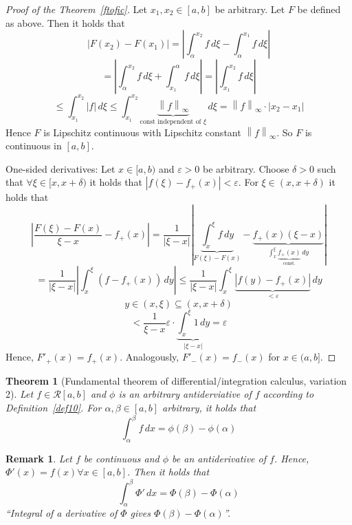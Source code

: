\documentclass{article}
\newtheorem{theorem}{Theorem}  \numberwithin{theorem}{section}
\newtheorem{remark}{Remark}  \numberwithin{remark}{section}
\newcommand{\norm}[1]{\left\|#1\right\|}
\newcommand{\card}[1]{\left|#1\right|}
\begin{document}
\begin{proof}[Proof of the Theorem~\ref{ftofic}]
  Let $x_1, x_2 \in [a,b]$ be arbitrary. Let $F$ be defined as above. Then it holds that
  \[ \card{F(x_2) - F(x_1)} = \card{\int_\alpha^{x_2} f \, d\xi - \int_\alpha^{x_1} f \, d\xi} \]
  \[ = \card{\int_\alpha^{x_2} f \, d\xi + \int_{x_1}^\alpha f \, d\xi} = \card{\int_{x_1}^{x_2} f \, d\xi} \]
  \[ \leq \int_{x_1}^{x_2} \card{f} \, d\xi \leq \int_{x_1}^{x_2} \underbrace{\norm{f}_{\infty}}_{\text{const independent of } \xi} \, d\xi  = \norm{f}_{\infty} \cdot \card{x_2 - x_1} \]
  Hence $F$ is Lipschitz continuous with Lipschitz constant $\norm{f}_{\infty}$. So $F$ is continuous in $[a,b]$.

  One-sided derivatives: Let $x \in [a,b)$ and $\varepsilon > 0$ be arbitrary.
  Choose $\delta > 0$ such that $\forall \xi \in [x, x+\delta)$ it holds that $\card{f(\xi) - f_+(x)} < \varepsilon$.
  For $\xi \in (x, x+\delta)$ it holds that
  \[ \card{\frac{F(\xi) - F(x)}{\xi - x} - f_+(x)} = \frac1{\card{\xi - x}} \card{\underbrace{\int_x^\xi f \, dy}_{F(\xi) - F(x)} - \underbrace{f_+(x)(\xi - x)}_{\int_x^\xi \underbrace{f_+(x)}_{\text{const.}} \, dy}} \]
  \[ = \frac{1}{\card{\xi - x}} \card{\int_x^\xi (f - f_+(x)) \, dy} \leq \frac{1}{\card{\xi - x}} \int_x^\xi \underbrace{\card{f(y) - f_+(x)}}_{< \varepsilon} \, dy \]
  \[ y \in (x, \xi) \subseteq (x, x+\delta) \]
  \[ < \frac{1}{\xi - x} \varepsilon \cdot \underbrace{\int_x^\xi 1 \, dy}_{\card{\xi - x}} = \varepsilon \]
  Hence, $F'_+(x) = f_+(x)$.
  Analogously, $F'_-(x) = f_-(x)$ for $x \in (a,b]$.
\end{proof}

\begin{theorem}[Fundamental theorem of differential/integration calculus, variation 2] %
  \label{satz5}
  Let $f \in \mathcal R[a,b]$ and $\phi$ is an arbitrary antiderviative of $f$ according to Definition~\ref{def10}.
  For $\alpha, \beta \in [a,b]$ arbitrary, it holds that
  \[ \int_\alpha^\beta f \, dx = \phi(\beta) - \phi(\alpha) \]
\end{theorem}

\begin{remark}
  Let $f$ be continuous and $\phi$ be an antiderivative of $f$.
  Hence, $\Phi'(x) = f(x) \forall x \in [a,b]$.
  Then it holds that
  \[ \int_{\alpha}^{\beta} \Phi' \, dx = \Phi(\beta) - \Phi(\alpha) \]
  \enquote{Integral of a derivative of $\Phi$ gives $\Phi(\beta) - \Phi(\alpha)$}.
\end{remark}
\end{document}
